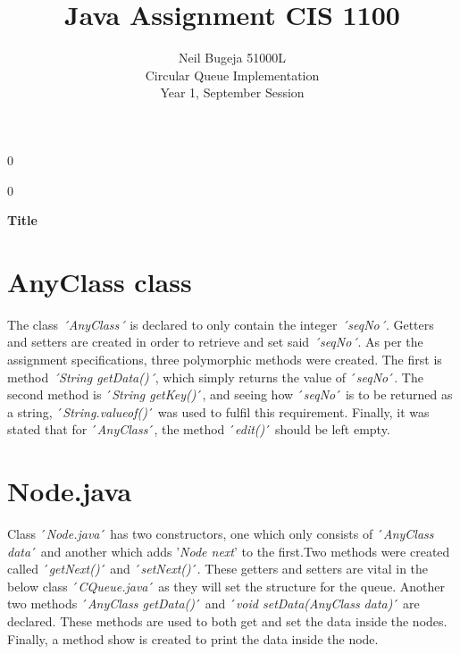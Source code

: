 \documentclass[12pt]{article}
\newcommand{\blind}{0}
\begin{document}
%

\def\spacingset#1{\renewcommand{\baselinestretch}%
{#1}\small\normalsize} \spacingset{1}



\blind
{
  \title{\bf Java Assignment CIS 1100}
  \author{Neil Bugeja 51000L
    \\Circular Queue Implementation
    \\Year 1, September Session\bigskip \bigskip}
  \maketitle
} \fi

\blind
{
  \bigskip
  \bigskip
  \bigskip
  \begin{center}
    {\LARGE\bf Title}
\end{center}
  \medskip
} \fi

\bigskip


\newpage
\spacingset{1.8} %

\section{AnyClass class}
The class \emph{´AnyClass´} is declared to only contain the integer \emph{´seqNo´}. Getters and setters are created in order to retrieve and set said \emph{´seqNo´}. As per the assignment specifications, three polymorphic methods were created. The first is method \emph{´String getData()´}, which simply returns the value of ´\emph{seqNo}´. The second method is ´\emph{String getKey()}´, and seeing how ´\emph{seqNo}´ is to be returned as a string, ´\emph{String.valueof()}´ was used to fulfil this requirement. Finally, it was stated that for ´\emph{AnyClass}´, the method ´\emph{edit()}´ should be left empty.
\bigskip

\section{Node.java}
Class ´\emph{Node.java}´ has two constructors, one which only consists of ´\emph{AnyClass data}´ and another which adds '\emph{Node next}' to the first.Two methods were created called ´\emph{getNext()}´ and ´\emph{setNext()}´. These getters and setters are vital in the below class ´\emph{CQueue.java}´ as they will set the structure for the queue. Another two methods ´\emph{AnyClass getData()}´ and ´\emph{void setData(AnyClass data)}´ are declared. These methods are used to both get and set the data inside the nodes. Finally, a method show is created to print the data inside the node.
\bigskip
\end{document}

